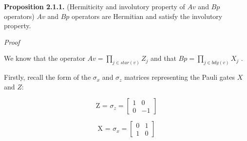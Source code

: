 \documentclass[12pt]{report}
\begin{document}
\begin{minipage}{1\textwidth}
		\textbf{Proposition 2.1.1.} (Hermiticity and involutory property of $Av$ and $Bp$ operators)
		$Av$ and $Bp$ operators are Hermitian and satisfy the involutory property.\newline
		
		\textit{Proof}\newline
		
		We know that the operator $ Av = \prod_{j \in star(v)} Z_j $ and that $ Bp = \prod_{j \in bdy(v)} X_j $ .\newline
		
		Firstly, recall the form of the $\sigma_x$ and $\sigma_z$ matrices representing the Pauli gates $X$ and $Z$:
		
		
		
		\[
		\text{Z = $\sigma_z$} =
		\begin{bmatrix}
			1 & 0 \\
			0 & -1
		\end{bmatrix}
		\]
		
		
		\[
		\text{X = $\sigma_x$} =
		\begin{bmatrix}
			0 & 1 \\
			1 & 0
		\end{bmatrix}
		\]
		
		
	\end{minipage}  
	
\end{document}
